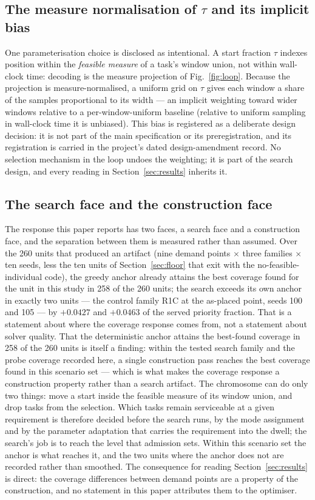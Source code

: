 \documentclass[preprint,authoryear]{elsarticle}
\begin{document}
\subsection{The measure normalisation of $\tau$ and its implicit bias}

One parameterisation choice is disclosed as intentional. A start fraction $\tau$ indexes position within the \emph{feasible measure} of a task's window union, not within wall-clock time: decoding is the measure projection of Fig.~\ref{fig:loop}. Because the projection is measure-normalised, a uniform grid on $\tau$ gives each window a share of the samples proportional to its width --- an implicit weighting toward wider windows relative to a per-window-uniform baseline (relative to uniform sampling in wall-clock time it is unbiased). This bias is registered as a deliberate design decision: it is not part of the main specification or its preregistration, and its registration is carried in the project's dated design-amendment record. No selection mechanism in the loop undoes the weighting; it is part of the search design, and every reading in Section~\ref{sec:results} inherits it.

\subsection{The search face and the construction face}\label{sec:faces}

The response this paper reports has two faces, a search face and a construction face, and the separation between them is measured rather than assumed. Over the 260 units that produced an artifact (nine demand points $\times$ three families $\times$ ten seeds, less the ten units of Section~\ref{sec:floor} that exit with the no-feasible-individual code), the greedy anchor already attains the best coverage found for the unit in this study in 258 of the 260 units; the search exceeds its own anchor in exactly two units --- the control family R1C at the as-placed point, seeds 100 and 105 --- by $+0.0427$ and $+0.0463$ of the served priority fraction. That is a statement about where the coverage response comes from, not a statement about solver quality. That the deterministic anchor attains the best-found coverage in 258 of the 260 units is itself a finding: within the tested search family and the probe coverage recorded here, a single construction pass reaches the best coverage found in this scenario set --- which is what makes the coverage response a construction property rather than a search artifact. The chromosome can do only two things: move a start inside the feasible measure of its window union, and drop tasks from the selection. Which tasks remain serviceable at a given requirement is therefore decided before the search runs, by the mode assignment and by the parameter adaptation that carries the requirement into the dwell; the search's job is to reach the level that admission sets. Within this scenario set the anchor is what reaches it, and the two units where the anchor does not are recorded rather than smoothed. The consequence for reading Section~\ref{sec:results} is direct: the coverage differences between demand points are a property of the construction, and no statement in this paper attributes them to the optimiser.
\end{document}
